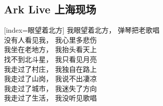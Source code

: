 
	



\subsection{Ark Live 上海现场}

\begin{songs}{}
  [index={眼望着北方}]
    我眼望着北方， 弹琴把老歌唱 \\
    没有人看见我， 我心里多悲伤 \\
    我坐在老地方， 我抬头看天上 \\
    找不到北斗星， 我只看见月亮 \\
    我走过了村庄， 我独自在路上 \\
    我走过了山岗， 我说不出凄凉 \\
    我走过了城市， 我迷失了方向 \\
    我走过了生活， 我没听见歌唱 \\
  \endsong

\end{songs}